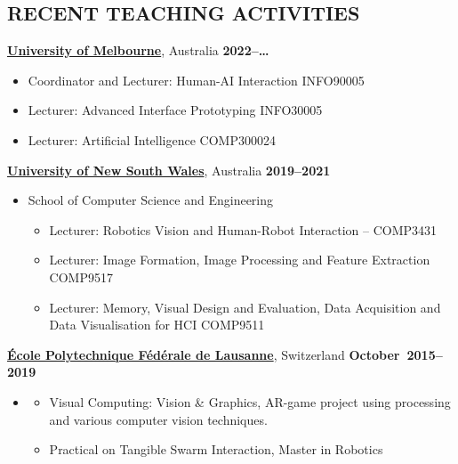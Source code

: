
\subsection{RECENT TEACHING ACTIVITIES}
\vspace{2pt}

\href{http://www.unimelb.edu.au}{\textbf{University of Melbourne}}, Australia \hfill \textbf{2022--\ldots}
\begin{itemize}
 \item Coordinator and Lecturer: Human-AI Interaction INFO90005
    \item Lecturer: Advanced Interface Prototyping INFO30005
    \item Lecturer: Artificial Intelligence COMP300024
\end{itemize}

\href{http://www.unsw.edu.au}{\textbf{University of New South Wales}}, Australia \hfill \textbf{2019--2021}
\begin{itemize}
    \item[] School of Computer Science and Engineering
    \begin{itemize}
        \item Lecturer: Robotics Vision and Human-Robot Interaction -- COMP3431 
        \item Lecturer: Image Formation, Image Processing and Feature Extraction COMP9517 
        \item Lecturer: Memory, Visual Design and Evaluation, Data Acquisition and Data Visualisation for HCI COMP9511
    \end{itemize}
\end{itemize}

\href{http://www.epfl.ch}{\textbf{École Polytechnique Fédérale de Lausanne}}, Switzerland \hfill \textbf{October~2015--2019}
\begin{itemize}
    \item[]
    \begin{itemize}
        \item Visual Computing: Vision \& Graphics, AR-game project using processing and various computer vision techniques. %
        \item Practical on Tangible Swarm Interaction, Master in Robotics
    \end{itemize}
\end{itemize}

